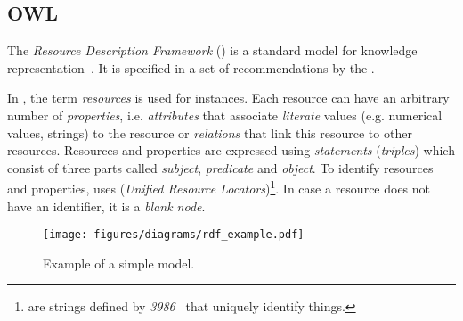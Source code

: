 \subsection{OWL}
\label{subsec:owl}

The \emph{Resource Description Framework} () is a standard model for knowledge representation~\cite{RDF}. It is specified in a set of recommendations by the .

In , the term \emph{resources} is used for instances. Each resource can have an arbitrary number of \emph{properties}, i.e. \emph{attributes} that associate \emph{literate} values (e.g. numerical values, strings) to the resource or \emph{relations} that link this resource to other resources. Resources and properties are expressed using \emph{statements} (\emph{triples}) which consist of three parts called \emph{subject}, \emph{predicate} and \emph{object}. To identify resources and properties,  uses  (\emph{Unified Resource Locators})\footnote{ are strings defined by \emph{ 3986}~\cite{rfc3986} that uniquely identify things.}. In case a resource does not have an identifier, it is a \emph{blank node}.

\begin{figure}
\centering
\texttt{[image: figures/diagrams/rdf\_example.pdf]}
\caption{Example of a simple  model.}
\label{fig:rdf_example}
\end{figure}

